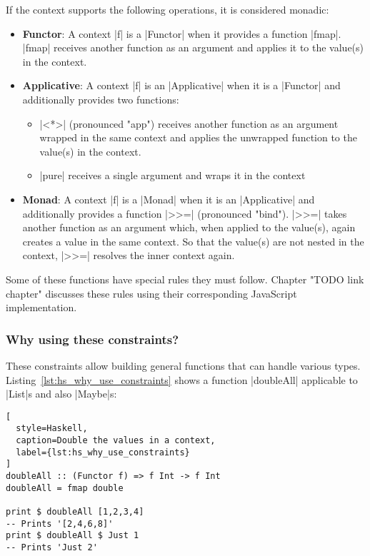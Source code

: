 If the context supports the following operations, it is considered monadic:

\begin{itemize}
  \item \textbf{Functor}: A context |f| is a |Functor| when it provides a function
|fmap|. |fmap| receives another function as an argument and applies it to the
value(s) in the context.\\
\item \textbf{Applicative}: A context |f| is an |Applicative| when it is a |Functor|
and additionally provides two functions:
\begin{itemize}
  \item |<*>| (pronounced "app") receives another function as an
    argument wrapped in the same context and applies the unwrapped function to
    the value(s) in the context.
  \item |pure| receives a single argument and wraps it in the context \\
\end{itemize}
\item \textbf{Monad}: A context |f| is a |Monad| when it is an |Applicative| and
additionally provides a function |>>=| (pronounced "bind"). |>>=| takes another
function as an argument which, when applied to the value(s), again creates a
value in the same context. So that the value(s) are not nested in the context,
|>>=| resolves the inner context again.
\end{itemize}

Some of these functions have special rules they must follow. Chapter "TODO link
chapter" discusses these rules using their corresponding JavaScript
implementation.
\subsubsection{Why using these constraints?} %
\label{sec:Why using these constraints?}
These constraints allow building general functions that can handle various
types. Listing~\ref{lst:hs_why_use_constraints} shows a function |doubleAll|
applicable to |List|s and also |Maybe|s:

\begin{lstlisting}[
  style=Haskell,
  caption=Double the values in a context,
  label={lst:hs_why_use_constraints}
]
doubleAll :: (Functor f) => f Int -> f Int
doubleAll = fmap double

print $ doubleAll [1,2,3,4]
-- Prints '[2,4,6,8]'
print $ doubleAll $ Just 1
-- Prints 'Just 2'
\end{lstlisting}

